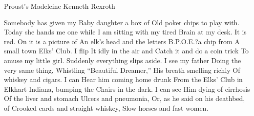 \begin{poem}
{Proust's Madeleine}
{Kenneth Rexroth}

Somebody has given my
Baby daughter a box of
Old poker chips to play with.
Today she hands me one while
I am sitting with my tired
Brain at my desk. It is red.
On it is a picture of
An elk's head and the letters
B.P.O.E.?a chip from
A small town Elks' Club. I flip
It idly in the air and
Catch it and do a coin trick
To amuse my little girl.
Suddenly everything slips aside.
I see my father
Doing the very same thing,
Whistling ``Beautiful Dreamer,''
His breath smelling richly
Of whiskey and cigars. I can
Hear him coming home drunk
From the Elks' Club in Elkhart
Indiana, bumping the
Chairs in the dark. I can see
Him dying of cirrhosis
Of the liver and stomach
Ulcers and pneumonia,
Or, as he said on his deathbed, of
Crooked cards and straight whiskey,
Slow horses and fast women.
\end{poem}



